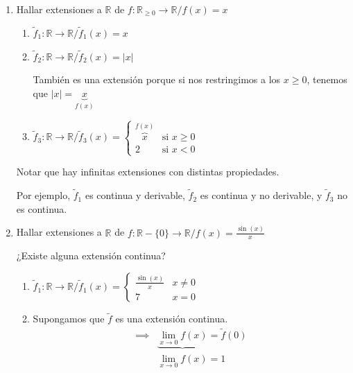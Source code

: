 \begin{enumerate}
    \item Hallar extensiones a $\mathbb{R}$ de $f: \mathbb{R}_{\geq 0} \to 
        \mathbb{R} / f(x) = x$

        \begin{enumerate}
            \item $\tilde{f}_1 : \mathbb{R} \to \mathbb{R} / \tilde{f}_1(x)=x$
            \item $\tilde{f}_2 : \mathbb{R}\to\mathbb{R} / \tilde{f}_2(x)=|x|$

                También es una extensión porque si nos restringimos a los 
                $x \geq 0$, tenemos que $|x| = \underbrace{x}_{f(x)}$

            \item $\tilde{f}_3: \mathbb{R}\to\mathbb{R}/\tilde{f}_3(x)=
                \begin{cases}
                    \overbrace{x}^{f(x)} & \text{si } x \geq 0 \\
                    2 & \text{si } x<0
                \end{cases}$

        \end{enumerate}
    Notar que hay infinitas extensiones con distintas propiedades.
    
    Por ejemplo, $\tilde{f}_1$ es continua y derivable, $\tilde{f}_2$
    es continua y no derivable, y $\tilde{f}_3$ no es continua.

    \item Hallar extensiones a $\mathbb{R}$ de $f: \mathbb{R}-\{0\} \to
        \mathbb{R} / f(x) = \frac{\sin{(x)}}{x}$

        ¿Existe alguna extensión continua?

        \begin{enumerate}
            \item $\tilde{f}_1: \mathbb{R}\to\mathbb{R} / \tilde{f}_1 (x) =
                \begin{cases}
                    \frac{\sin{(x)}}{x} & x \neq 0 \\
                    7 & x = 0
                \end{cases}$

            \item Supongamos que $\tilde{f}$ es una extensión continua. 
                \begin{align*}
                    \implies &\underbrace{\lim_{x\to 0} f(x)} = \tilde{f}(0)\\
                             &\lim_{x\to 0} f(x) = 1
                \end{align*}


\end{enumerate}
\end{enumerate}

